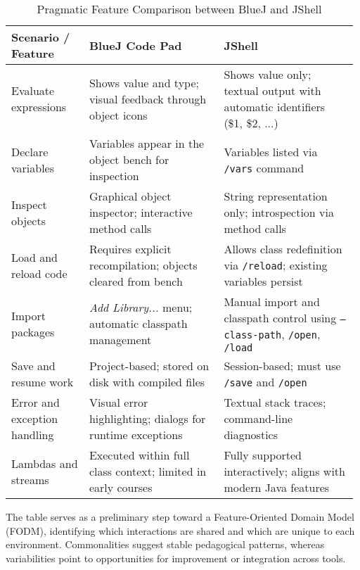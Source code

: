 \documentclass{article}
\begin{document}
\begin{table}[h]
\centering
\caption{Pragmatic Feature Comparison between BlueJ and JShell}
\label{tab:features}

\begin{tabularx}{\linewidth}{>{\raggedright\arraybackslash}p{0.22\linewidth}
                                 >{\raggedright\arraybackslash}p{0.38\linewidth}
                                 >{\raggedright\arraybackslash}p{0.38\linewidth}}
\toprule
\textbf{Scenario / Feature} & \textbf{BlueJ Code Pad} & \textbf{JShell} \\
\midrule
Evaluate expressions & Shows value and type; visual feedback through object icons & Shows value only; textual output with automatic identifiers (\$1, \$2, ...) \\
Declare variables & Variables appear in the object bench for inspection & Variables listed via \texttt{/vars} command \\
Inspect objects & Graphical object inspector; interactive method calls & String representation only; introspection via method calls \\
Load and reload code & Requires explicit recompilation; objects cleared from bench & Allows class redefinition via \texttt{/reload}; existing variables persist \\
Import packages & \textit{Add Library...} menu; automatic classpath management & Manual import and classpath control using \texttt{--class-path}, \texttt{/open}, \texttt{/load} \\
Save and resume work & Project-based; stored on disk with compiled files & Session-based; must use \texttt{/save} and \texttt{/open} \\
Error and exception handling & Visual error highlighting; dialogs for runtime exceptions & Textual stack traces; command-line diagnostics \\
Lambdas and streams & Executed within full class context; limited in early courses & Fully supported interactively; aligns with modern Java features \\
\bottomrule
\end{tabularx}
\end{table}

The table serves as a preliminary step toward a Feature-Oriented Domain Model (FODM), identifying which interactions are shared and which are unique to each environment. Commonalities suggest stable pedagogical patterns, whereas variabilities point to opportunities for improvement or integration across tools.
\end{document}
